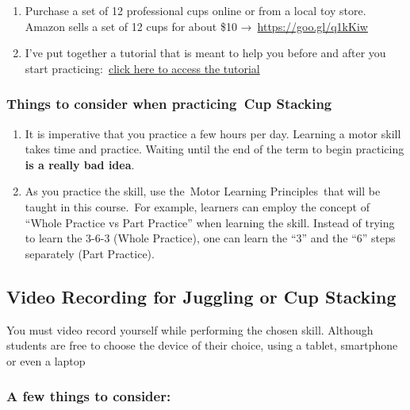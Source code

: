 \documentclass[
  letterpaper,
  DIV=11,
  numbers=noendperiod]{scrartcl}
\providecommand{\tightlist}{%
  \setlength{\itemsep}{0pt}\setlength{\parskip}{0pt}}\usepackage{longtable,booktabs,array}
\begin{document}
\begin{enumerate}
\def\labelenumi{\arabic{enumi}.}
\tightlist
\item
  Purchase a set of 12 professional cups online or from a local toy
  store. Amazon sells a set of 12 cups for about \$10
  →~\url{https://goo.gl/q1kKiw}
\item
  I've put together a tutorial that is meant to help you before and
  after you start practicing:~\protect\hyperlink{sec-appendix-b}{click
  here to access the tutorial}
\end{enumerate}

\hypertarget{things-to-consider-when-practicing-cup-stacking}{%
\subsubsection{\texorpdfstring{Things to consider when
practicing~\textbf{Cup
Stacking}}{Things to consider when practicing~Cup Stacking}}\label{things-to-consider-when-practicing-cup-stacking}}

\begin{enumerate}
\def\labelenumi{\arabic{enumi}.}
\tightlist
\item
  It is imperative that you practice a few hours per day. Learning a
  motor skill takes time and practice. Waiting until the end of the term
  to begin practicing \textbf{is a really bad idea}.
\item
  As you practice the skill, use the~Motor Learning Principles~that will
  be taught in this course.~For example, learners can employ the concept
  of ``Whole Practice vs Part Practice'' when learning the skill.
  Instead of trying to learn the 3-6-3 (Whole Practice), one can learn
  the ``3'' and the ``6'' steps separately (Part Practice).
\end{enumerate}

\hypertarget{video-recording-for-juggling-or-cup-stacking}{%
\subsection{\texorpdfstring{Video Recording for \textbf{Juggling or Cup
Stacking}}{Video Recording for Juggling or Cup Stacking}}\label{video-recording-for-juggling-or-cup-stacking}}

You must video record yourself while performing the chosen skill.
Although students are free to choose the device of their choice, using a
tablet, smartphone or even a laptop

\hypertarget{a-few-things-to-consider}{%
\subsubsection{A few things to
consider:}\label{a-few-things-to-consider}}
\end{document}
